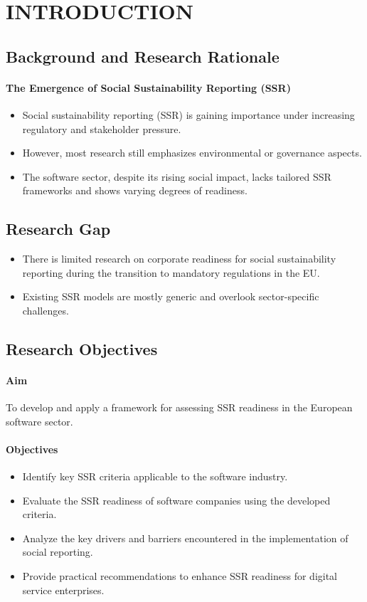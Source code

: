 \chapter{INTRODUCTION}

\section{Background and Research Rationale}

\subsubsection{The Emergence of Social Sustainability Reporting (SSR)}
\begin{itemize}
    \item Social sustainability reporting (SSR) 
    is gaining importance under increasing regulatory and stakeholder pressure.
    \item However, most research still emphasizes environmental or governance aspects. 
    \item The software sector, despite its rising social impact, lacks tailored SSR frameworks and shows varying degrees of readiness.
\end{itemize}

\section{Research Gap}
\begin{itemize}
    \item There is limited research on corporate readiness for social 
    sustainability reporting during the transition to mandatory 
    regulations in the EU.
    \item Existing SSR models are mostly generic and overlook sector-specific challenges.
\end{itemize}

\section{Research Objectives}
\subsubsection{Aim}
To develop and apply a framework 
for assessing SSR readiness in the European software sector.

\subsubsection{Objectives}
\begin{itemize}
    \item Identify key SSR criteria applicable to the software industry.
    \item Evaluate the SSR readiness of software companies using the developed criteria.
    \item Analyze the key drivers and barriers encountered in the implementation of social reporting.
    \item Provide practical recommendations to enhance SSR readiness for digital service enterprises.
\end{itemize}

